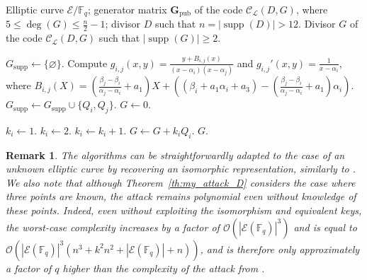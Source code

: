 \documentclass[sn-mathphys-num]{sn-jnl_modified}
\newcommand{\FF}{\ensuremath{\mathbb{F}}}
\newtheorem{remark}{Remark}
\begin{document}
\begin{algorithm}[H]
\fontsize{9pt}{10pt}\selectfont
\caption{Recovering the divisor $G$}
\label{alg:attack_G}
\begin{algorithmic}[1]
\Require Elliptic curve $\mathcal{E}/\mathbb{F}_q$; generator matrix $\mathbf{G}_{\operatorname{pub}}$ of the code $\mathcal{C}_\mathscr{L}(D, G)$, where $5 \leq \deg(G) \leq \frac{n}{2}-1$; divisor $D$ such that $n = |\operatorname{supp}(D)| > 12$.
\Ensure Divisor $G$ of the code $\mathcal{C}_\mathscr{L}(D, G)$ such that $|\operatorname{supp}(G)| \geq 2$.

\State $G_{\operatorname{supp}} \gets \{\varnothing\}$.
\State Compute $g_{i,j}(x, y) = \frac{y + B_{i,j}(x)}{(x - \alpha_i)(x - \alpha_j)}$ and $g_{i,j}'(x, y) = \frac{1}{x - \alpha_i}$, where $B_{i,j}(X) = \left( \frac{\beta_j - \beta_i}{\alpha_j - \alpha_i} + a_1 \right) X + \left( (\beta_i + a_1\alpha_i + a_3) - \left( \frac{\beta_j - \beta_i}{\alpha_j - \alpha_i} + a_1 \right) \alpha_i \right)$.
\State $G_{\operatorname{supp}} \gets G_{\operatorname{supp}} \cup \{Q_i, Q_j\}$.
\EndIf
\EndIf
\EndFor
\EndFor
\State $G \gets 0$.

\State $k_i \gets 1$.
\Else
\State $k_i \gets 2$.
 
\State $k_i \gets k_i + 1$.
\EndWhile
\EndIf
\State $G \gets G + k_i Q_i$.
\EndFor
\State\Return $G$.
\end{algorithmic}
\end{algorithm}


\begin{remark}
The algorithms can be straightforwardly adapted to the case of an unknown elliptic curve by recovering an isomorphic representation, similarly to \cite{Sh25}. We also note that although Theorem~\ref{th:my_attack_D} considers the case where three points are known, the attack remains polynomial even without knowledge of these points. Indeed, even without exploiting the isomorphism and equivalent keys, the worst-case complexity increases by a factor of $\mathcal{O}(|\mathcal{E}(\FF_q)|^3)$ and is equal to $\mathcal{O}\!\left(|\mathcal{E}(\FF_q)|^3 \left(n^3 + k^2n^2 + |\mathcal{E}(\FF_q)| + n\right)\right)$, and is therefore only approximately a factor of $q$ higher than the complexity of the attack from \cite{Sh25}.
\end{remark}
\end{document}
